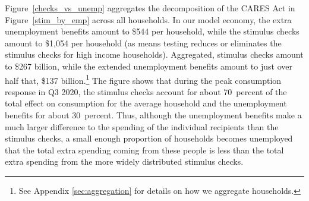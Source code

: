 \documentclass[titlepage]{\econtex}
\begin{document}
Figure~\ref{checks_vs_unemp} aggregates the decomposition of the CARES Act in Figure~\ref{stim_by_emp} across all households.
In our model economy, the extra unemployment benefits amount to \$544 per household, while the stimulus checks amount to \$1,054 per household (as means testing reduces or eliminates the stimulus checks for high income households).
Aggregated, stimulus checks amount to \$267 billion, while the extended unemployment benefits amount to just over half that, \$137 billion.\footnote{See Appendix \ref{sec:aggregation} for details on how we aggregate households.}
The figure shows that during the peak consumption response in Q3 2020, the stimulus checks account for about 70~percent of the total effect on consumption for the average household and the unemployment benefits for about 30~percent.  Thus, although the unemployment benefits make a much larger difference to the spending of the individual recipients than the stimulus checks, a small enough proportion of households becomes unemployed that the total extra spending coming from these people is less than the total extra spending from the more widely distributed stimulus checks.
\end{document}
